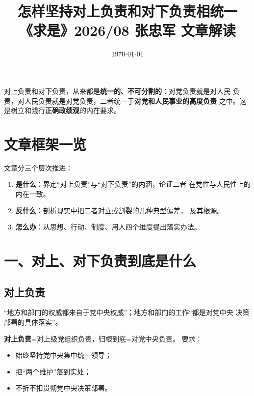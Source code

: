 \documentclass[11pt,a4paper]{ctexart}
\title{怎样坚持对上负责和对下负责相统一\\
  \large 《求是》2026/08 张忠军 文章解读}
\author{}
\date{\today}
\begin{document}
\maketitle

\begin{coreblock}
对上负责和对下负责，从来都是\textbf{统一的、不可分割的}：对党负责就是对人民
负责，对人民负责就是对党负责，二者统一于\textbf{对党和人民事业的高度负责}
之中。这是树立和践行\textbf{正确政绩观}的内在要求。
\end{coreblock}

\tableofcontents
\newpage

\section{文章框架一览}

文章分三个层次推进：

\begin{enumerate}[label=\textbf{\arabic*.}]
  \item \textbf{是什么}：界定``对上负责''与``对下负责''的内涵，论证二者
        在党性与人民性上的内在一致。
  \item \textbf{反什么}：剖析现实中把二者对立或割裂的几种典型偏差，
        及其根源。
  \item \textbf{怎么办}：从思想、行动、制度、用人四个维度提出落实办法。
\end{enumerate}

\section{一、对上、对下负责到底是什么}

\subsection*{对上负责}

\begin{quoteblock}
``地方和部门的权威都来自于党中央权威''；地方和部门的工作``都是对党中央
决策部署的具体落实''。
\end{quoteblock}

\textbf{对上负责}=对上级党组织负责，归根到底=对党中央负责。
要求：

\begin{itemize}
  \item 始终坚持党中央集中统一领导；
  \item 把``两个维护''落到实处；
  \item 不折不扣贯彻党中央决策部署。
\end{itemize}
\end{document}
